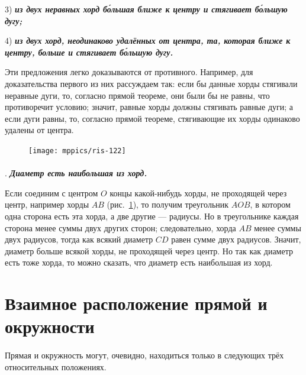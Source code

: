 \documentclass[oneside]{book}
\begin{document}
3) \textbf{\emph{из двух неравных хорд б\'{о}льшая ближе к центру и стягивает б\'{о}льшую дугу;}}

4) \textbf{\emph{из двух хорд, неодинаково удалённых от центра, та, которая ближе к центру, больше и стягивает б\'{о}льшую дугу.}}

Эти предложения легко доказываются от противного.
Например, для доказательства первого из них рассуждаем так:
если бы данные хорды стягивали неравные дуги, то, согласно прямой теореме, они были бы не равны, что противоречит условию;
значит, равные хорды должны стягивать равные дуги;
а если дуги равны, то, согласно прямой теореме, стягивающие их хорды одинаково удалены от центра.

\begin{figure}
\vskip-12mm
\centering
\texttt{[image: mppics/ris-122]}
\caption{}\label{1938/ris-122}
\end{figure}

\paragraph{}\label{1938/111}
\mbox{.}
\textbf{\emph{Диаметр есть наибольшая из хорд.}}


Если соединим с центром $O$ концы какой-нибудь хорды, не проходящей через центр, например хорды $AB$ (рис.~\ref{1938/ris-122}), то получим треугольник $AOB$, в котором одна сторона есть эта хорда, а две другие — радиусы.
Но в треугольнике каждая сторона менее суммы двух других сторон;
следовательно, хорда $AB$ менее суммы двух радиусов, тогда как всякий диаметр $CD$ равен сумме двух радиусов.
Значит, диаметр больше всякой хорды, не проходящей через центр.
Но так как диаметр есть тоже хорда, то можно сказать, что диаметр есть наибольшая из хорд.

\section{Взаимное расположение прямой и окружности}


\paragraph{}\label{1938/112}
Прямая и окружность могут, очевидно, находиться только в следующих трёх относительных положениях.
\end{document}
